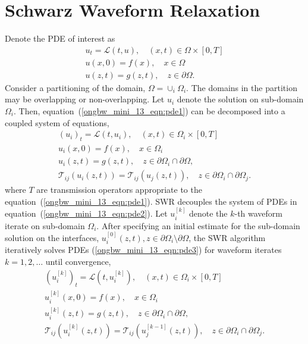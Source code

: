 \documentclass{svmult-ddm}
\begin{document}
\section{Schwarz Waveform Relaxation}
\label{ongbw_mini_13_sec:waveform}

Denote the PDE of interest as 
\begin{eqnarray}
  \label{ongbw_mini_13_eqn:pde1}
  u_t =  \mathcal{L}(t,u), \quad (x,t)\in \Omega\times[0,T]\\
  \nonumber
  u(x,0) = f(x), \quad x \in \Omega \\
  \nonumber
  u(z,t) = g(z,t), \quad z \in \partial\Omega. 
\end{eqnarray}
Consider a partitioning of the domain, $\Omega = \cup_i\Omega_i$.
The domains in the partition may be overlapping or non-overlapping.
Let $u_i$ denote the solution on sub-domain $\Omega_i$.
Then, equation~(\ref{ongbw_mini_13_eqn:pde1}) can be decomposed into a
coupled system of equations,
\begin{eqnarray}
  \label{ongbw_mini_13_eqn:pde2}
  (u_i)_t =  \mathcal{L}(t,u_i), \quad (x,t)\in \Omega_i\times[0,T]\\
  \nonumber
  u_i(x,0) = f(x), \quad x \in \Omega_i \\
  \nonumber
  u_i(z,t) = g(z,t), \quad z \in \partial\Omega_i\cap\partial\Omega, \\
  \nonumber
  \mathcal{T}_{ij}(u_{i}(z,t)) = \mathcal{T}_{ij}(u_{j}(z,t)), \quad z \in \partial\Omega_i\cap\partial\Omega_j.
\end{eqnarray}
where $T$ are transmission operators appropriate to the
equation~(\ref{ongbw_mini_13_eqn:pde1}).  SWR decouples the system of
PDEs in equation~(\ref{ongbw_mini_13_eqn:pde2}).  Let $u_i^{[k]}$
denote the $k$-th waveform iterate on sub-domain $\Omega_i$. After
specifying an initial estimate for the sub-domain solution on the
interfaces, $u_i^{[0]}(z,t),
z\in\partial\Omega_i\setminus\partial\Omega$, the SWR algorithm
iteratively solves PDEs (\ref{ongbw_mini_13_eqn:pde3}) for waveform
iterates $k=1,2,\ldots$ until convergence,
\begin{eqnarray}
  \label{ongbw_mini_13_eqn:pde3}
  (u_i^{[k]})_t =  \mathcal{L}(t,u_i^{[k]}), \quad (x,t)\in \Omega_i\times[0,T]\\
  \nonumber
  u_i^{[k]}(x,0) = f(x), \quad x \in \Omega_i \\
  \nonumber
  u_i^{[k]}(z,t) = g(z,t), \quad z \in \partial\Omega_i\cap\partial\Omega, \\
  \nonumber
  \mathcal{T}_{ij}(u_{i}^{[k]}(z,t)) = \mathcal{T}_{ij}(u_{j}^{[k-1]}(z,t)), \quad z \in \partial\Omega_i\cap\partial\Omega_j.
\end{eqnarray}
\end{document}
